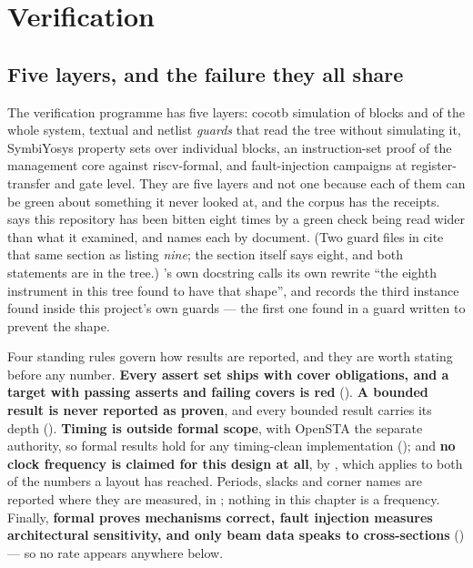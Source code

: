 
\chapter{Verification}
\label{ch:verif}

\section{Five layers, and the failure they all share}
\label{sec:verif-shape}

The verification programme has five layers: cocotb simulation of blocks
and of the whole system, textual and netlist \emph{guards} that read the
tree without simulating it, SymbiYosys property sets over individual
blocks, an instruction-set proof of the management core against
riscv-formal, and fault-injection campaigns at register-transfer and
gate level. They are five layers and not one because each of them can be
green about something it never looked at, and the corpus has the receipts.
 says this repository has been bitten eight times
by a green check being read wider than what it examined, and names each
by document. (Two guard files in  cite that same section
as listing \emph{nine}; the section itself says eight, and both
statements are in the tree.)
's own docstring calls its own
rewrite ``the eighth instrument in this tree found to have that shape'',
and  records the third instance found inside this
project's own guards --- the first one found in a guard written to
prevent the shape.

Four standing rules govern how results are reported, and they are worth
stating before any number. \textbf{Every assert set ships with cover
obligations, and a target with passing asserts and failing covers is
red} (). \textbf{A bounded result is never
reported as proven}, and every bounded result carries its depth
(). \textbf{Timing is outside formal scope}, with
OpenSTA the separate authority, so formal results hold for any
timing-clean implementation (); and \textbf{no
clock frequency is claimed for this design at all}, by
, which  applies to
both of the numbers a layout has reached. Periods, slacks and corner
names are reported where they are measured, in
; nothing in this chapter is a frequency. Finally,
\textbf{formal proves mechanisms correct, fault injection measures
architectural sensitivity, and only beam data speaks to cross-sections}
() --- so no rate appears anywhere below.

